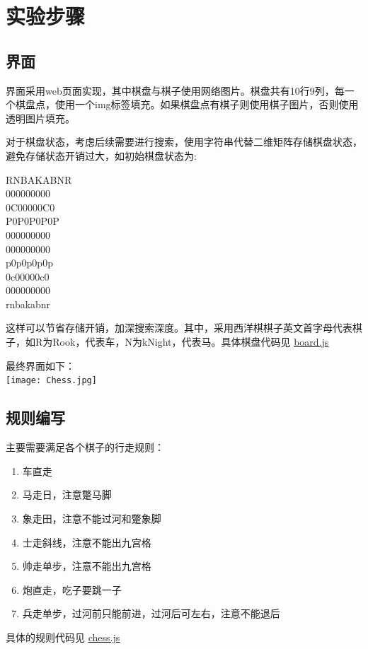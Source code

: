 \section{实验步骤}
\subsection{界面}
界面采用web页面实现，其中棋盘与棋子使用网络图片。棋盘共有10行9列，每一个棋盘点，使用一个img标签填充。如果棋盘点有棋子则使用棋子图片，否则使用透明图片填充。

对于棋盘状态，考虑后续需要进行搜索，使用字符串代替二维矩阵存储棋盘状态，避免存储状态开销过大，如初始棋盘状态为:
\begin{center}
RNBAKABNR\\000000000\\0C00000C0\\P0P0P0P0P\\000000000\\000000000\\p0p0p0p0p\\0c00000c0\\000000000\\rnbakabnr
\end{center}
这样可以节省存储开销，加深搜索深度。其中，采用西洋棋棋子英文首字母代表棋子，如R为Rook，代表车，N为kNight，代表马。具体棋盘代码见 \underline{\href{https://github.com/xwy27/ArtificialIntelligenceProjects/blob/master/AI_Web/static/js/ChineseChess/board.js}{board.js}}

最终界面如下：\\
\texttt{[image: Chess.jpg]}

\subsection{规则编写}

主要需要满足各个棋子的行走规则：
\begin{enumerate}
    \item 车直走
    \item 马走日，注意蹩马脚
    \item 象走田，注意不能过河和蹩象脚
    \item 士走斜线，注意不能出九宫格
    \item 帅走单步，注意不能出九宫格
    \item 炮直走，吃子要跳一子
    \item 兵走单步，过河前只能前进，过河后可左右，注意不能退后
\end{enumerate}
具体的规则代码见 \underline{\href{https://github.com/xwy27/ArtificialIntelligenceProjects/blob/master/AI_Web/static/js/ChineseChess/chess.js}{chess.js}}


